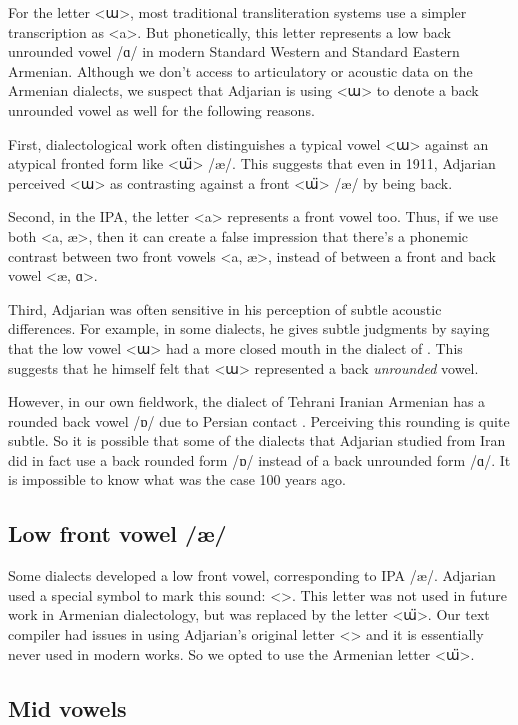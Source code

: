 For the letter <ա>, most traditional transliteration systems use a simpler transcription as <a>.  But phonetically, this letter represents a low back unrounded vowel /ɑ/ in modern Standard Western and Standard Eastern Armenian. Although we don't access to articulatory or acoustic data on the Armenian dialects, we suspect that Adjarian is using <ա> to denote a back unrounded vowel as well  for the following reasons. 


First, dialectological work often distinguishes a typical vowel <ա>  against an atypical fronted form like <ա̈> /æ/. This suggests that even in 1911, Adjarian perceived <ա> as contrasting against a front <ա̈> /æ/ by being back. 

Second, in the IPA, the letter <a> represents a front vowel too. Thus, if we use both <a, æ>, then it can create a false impression that there's a phonemic contrast between two front vowels <a, æ>, instead of between a front and back vowel <æ, ɑ>. 

Third, Adjarian was often sensitive in his perception of subtle acoustic differences. For example, in some dialects, he gives subtle judgments by saying that the low vowel <ա> had a more closed mouth in the dialect of . This suggests that he himself felt that <ա> represented a back \textit{unrounded} vowel. 

However,  in our own fieldwork, the dialect of Tehrani Iranian Armenian has a rounded back vowel /ɒ/ due to Persian contact \citep{DolatianEtAl-prep-IranianGrammar}. Perceiving this rounding is quite subtle. So it is possible that some of the dialects that Adjarian studied from Iran did in fact use a back rounded form /ɒ/ instead of a back unrounded form /ɑ/. It is impossible to know what was the case 100 years ago.

\subsection{Low front vowel /æ/}

Some dialects developed a low front vowel, corresponding to IPA /æ/. Adjarian used a special symbol to mark this sound: 
<>. This letter was not used in future work in Armenian dialectology, but was replaced by the letter <ա̈>. Our text compiler had issues in using Adjarian's original letter <> and it is essentially never used in modern works. So we opted to use the Armenian letter <ա̈>. 

\subsection{Mid vowels}


